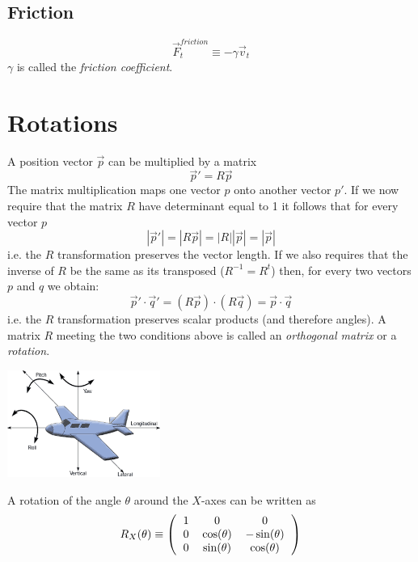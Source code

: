 \documentclass[12pt]{article}
\begin{document}
\subsection{Friction}

\begin{equation}
  \vec F_t^{friction} \equiv - \gamma \vec v_t
\end{equation}
$\gamma$ is called the {\it friction coefficient}.

\section{Rotations}

A position vector $\vec p$ can be multiplied by a matrix
\begin{equation}
\vec p' = R \vec p
\end{equation}
The matrix multiplication maps one vector $p$ onto another vector $p'$. If we now require that the matrix $R$ have determinant equal to 1 it follows that for every vector $p$
\begin{equation}
|\vec p'| = |R\vec p| = |R||\vec p| = |\vec p|
\end{equation}
i.e. the $R$ transformation preserves the vector length. If we also requires that the inverse of $R$ be the same as its transposed ($R^{-1}=R^t$) then, for every two vectors $p$ and $q$ we obtain:
\begin{equation}
\vec p' \cdot \vec q' = (R\vec p)\cdot(R\vec q) = \vec p \cdot \vec q
\end{equation}
i.e. the $R$ transformation preserves scalar products (and therefore angles).
A matrix $R$ meeting the two conditions above is called an {\it orthogonal matrix} or a {\it rotation}.

\begin{center}
\includegraphics[width=5cm]{images/plane.png}
\end{center}

A rotation of the angle $\theta$ around the $X$-axes can be written as
\begin{equation}
R_X(\theta) \equiv \left(\begin{tabular}{ccc}
1 & 0 & 0 \\
0 & $\cos(\theta)$ & $-\sin(\theta)$  \\
0 & $\sin(\theta)$ & $\cos(\theta) $ 
\end{tabular}\right)
\end{equation}
\end{document}
